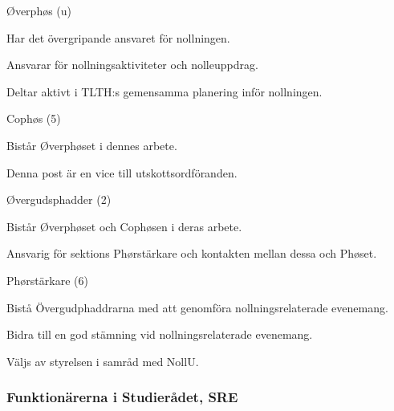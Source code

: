 \documentclass[10pt]{article}
\begin{document}
\begin{emptylist}
    \item Øverphøs (u)
        \begin{dashlist}
            \item Har det övergripande ansvaret för nollningen.
            \item Ansvarar för nollningsaktiviteter och nolleuppdrag.
            \item Deltar aktivt i TLTH:s gemensamma planering inför nollningen.
        \end{dashlist}
    \item Cophøs (5)
        \begin{dashlist}
          \item Bistår Øverphøset i dennes arbete.
          \item Denna post är en vice till utskottsordföranden.
        \end{dashlist}
    \item Øvergudsphadder (2)
        \begin{dashlist}
          \item Bistår Øverphøset och Cophøsen i deras arbete.
          \item Ansvarig för sektions Phørstärkare och kontakten mellan dessa och Phøset.
        \end{dashlist}
    \item Phørstärkare (6)
        \begin{dashlist}
            \item Bistå Övergudphaddrarna med att genomföra nollningsrelaterade evenemang.
            \item Bidra till en god stämning vid nollningsrelaterade evenemang.
            \item Väljs av styrelsen i samråd med NollU.
        \end{dashlist}
\end{emptylist}
\subsubsection{Funktionärerna i Studierådet, SRE}
\end{document}
